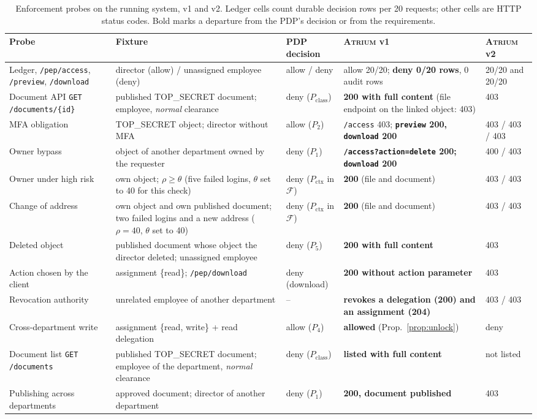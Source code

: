 \documentclass[sigconf,review,anonymous]{acmart}
\newcommand{\sysname}{\textsc{Atrium}\xspace}
\newcommand{\sysname}{\textsc{OpenZTAC}\xspace}
\newcommand{\Pc}{P_{\mathrm{class}}}
\newcommand{\Px}{P_{\mathrm{ctx}}}
\begin{document}
\begin{table}[t]
\caption{Enforcement probes on the running system, v1 and v2. Ledger cells count durable decision rows per 20
requests; other cells are HTTP status codes. Bold marks a departure from the PDP's decision or from the
requirements.}
\label{tab:l3}
\small
\begin{tabularx}{\textwidth}{@{}p{4.2cm}Xp{1.9cm}p{4.3cm}p{2.3cm}@{}}
\toprule
Probe & Fixture & PDP decision & \sysname v1 & \sysname v2 \\
\midrule
Ledger, \texttt{/pep/access}, \texttt{/preview}, \texttt{/download} & director (allow) / unassigned employee (deny) & allow / deny & allow 20/20; \textbf{deny 0/20 rows}, 0 audit rows & 20/20 and 20/20 \\
Document API \texttt{GET /documents/\{id\}} & published TOP\_SECRET document; employee, \emph{normal} clearance & deny ($\Pc$) & \textbf{200 with full content} (file endpoint on the linked object: 403) & 403 \\
MFA obligation & TOP\_SECRET object; director without MFA & allow ($P_2$) & \texttt{/access} 403; \textbf{\texttt{preview} 200, \texttt{download} 200} & 403 / 403 / 403 \\
Owner bypass & object of another department owned by the requester & deny ($P_1$) & \textbf{\texttt{/access?action=delete} 200; \texttt{download} 200} & 400 / 403 \\
Owner under high risk & own object; $\rho\ge\theta$ (five failed logins, $\theta$ set to 40 for this check) & deny ($\Px$ in $\mathcal{F}$) & \textbf{200} (file and document) & 403 / 403 \\
Change of address & own object and own published document; two failed logins and a new address ($\rho=40$, $\theta$ set to 40) & deny ($\Px$ in $\mathcal{F}$) & \textbf{200} (file and document) & 403 / 403 \\
Deleted object & published document whose object the director deleted; unassigned employee & deny ($P_5$) & \textbf{200 with full content} & 403 \\
Action chosen by the client & assignment \{read\}; \texttt{/pep/download} & deny (download) & \textbf{200 without action parameter} & 403 \\
Revocation authority & unrelated employee of another department & -- & \textbf{revokes a delegation (200) and an assignment (204)} & 403 / 403 \\
Cross-department write & assignment \{read, write\} + read delegation & allow ($P_4$) & \textbf{allowed} (Prop.~\ref{prop:unlock}) & deny \\
Document list \texttt{GET /documents} & published TOP\_SECRET document; employee of the department, \emph{normal} clearance & deny ($\Pc$) & \textbf{listed with full content} & not listed \\
Publishing across departments & approved document; director of another department & deny ($P_1$) & \textbf{200, document published} & 403 \\
\bottomrule
\end{tabularx}
\end{table}
\end{document}
